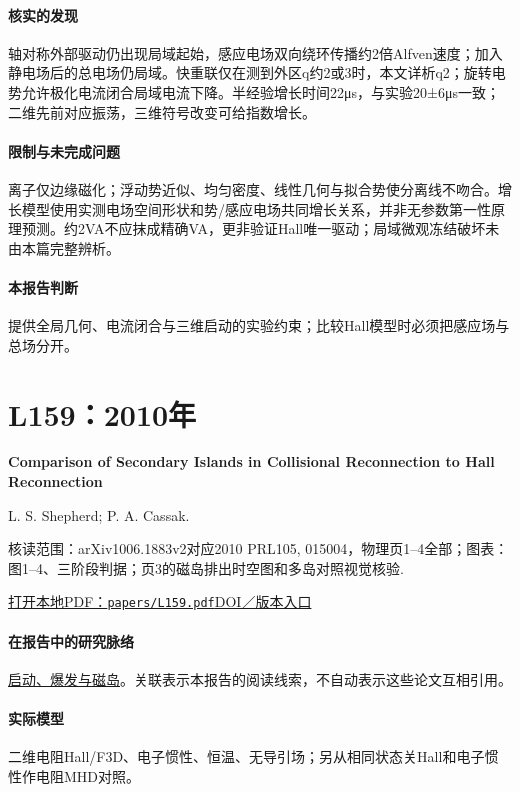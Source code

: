 \paragraph{核实的发现}轴对称外部驱动仍出现局域起始，感应电场双向绕环传播约2倍Alfven速度；加入静电场后的总电场仍局域。快重联仅在测到外区q约2或3时，本文详析q2；旋转电势允许极化电流闭合局域电流下降。半经验增长时间22μs，与实验20±6μs一致；二维先前对应振荡，三维符号改变可给指数增长。

\paragraph{限制与未完成问题}离子仅边缘磁化；浮动势近似、均匀密度、线性几何与拟合势使分离线不吻合。增长模型使用实测电场空间形状和势/感应电场共同增长关系，并非无参数第一性原理预测。约2VA不应抹成精确VA，更非验证Hall唯一驱动；局域微观冻结破坏未由本篇完整辨析。

\paragraph{本报告判断}提供全局几何、电流闭合与三维启动的实验约束；比较Hall模型时必须把感应场与总场分开。

\section{L159：2010年}\label{paper:L159}

\textbf{Comparison of Secondary Islands in Collisional Reconnection to Hall Reconnection}\citep{L159}\

L. S. Shepherd;  P. A. Cassak.

\textsf{核读范围：}arXiv1006.1883v2对应2010 PRL105, 015004，物理页1–4全部；\textsf{图表：}图1–4、三阶段判据；页3的磁岛排出时空图和多岛对照视觉核验.

\href{run:papers/L159.pdf}{打开本地PDF：\texttt{papers/L159.pdf}}\quad\href{https://doi.org/10.1103/physrevlett.105.015004}{DOI／版本入口}

\paragraph{在报告中的研究脉络}\hyperref[story:onset]{启动、爆发与磁岛}。关联表示本报告的阅读线索，不自动表示这些论文互相引用。

\paragraph{实际模型}二维电阻Hall/F3D、电子惯性、恒温、无导引场；另从相同状态关Hall和电子惯性作电阻MHD对照。

